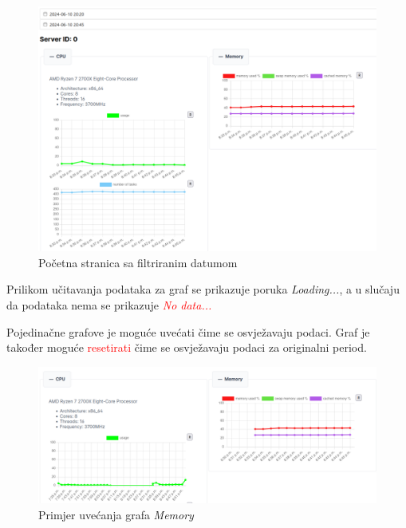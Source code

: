 \documentclass[zavrsnirad]{fer}
\begin{document}
\begin{figure}[htb]
	\centering
	\includegraphics[width=1\linewidth]{images/web_2.png} 
	\caption{Početna stranica sa filtriranim datumom}
\end{figure}
\FloatBarrier
Prilikom učitavanja podataka za graf se prikazuje poruka \textit{Loading...}, a u slučaju da podataka nema se prikazuje \textcolor{red}{\textit{No data...}}

Pojedinačne grafove je moguće uvećati čime se osvježavaju podaci. Graf je također moguće \textcolor{red}{resetirati} čime se osvježavaju podaci za originalni period.
\begin{figure}[htb]
	\centering
	\includegraphics[width=1\linewidth]{images/web_3.png} 
	\caption{Primjer uvećanja grafa \textit{Memory}}
\end{figure}
\FloatBarrier
\end{document}
